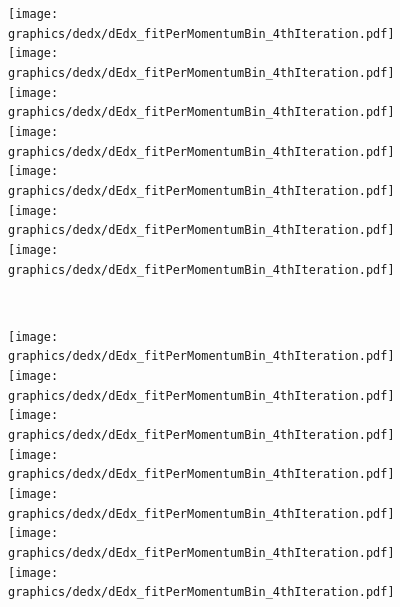 \begin{figure}[t!]%
\ContinuedFloat%
\centering%
\parbox{0.495\textwidth}{
  \centering
  \texttt{[image: graphics/dedx/dEdx\_fitPerMomentumBin\_4thIteration.pdf]}\\[3pt]
  \texttt{[image: graphics/dedx/dEdx\_fitPerMomentumBin\_4thIteration.pdf]}\\[3pt]
  \texttt{[image: graphics/dedx/dEdx\_fitPerMomentumBin\_4thIteration.pdf]}\\[3pt]
  \texttt{[image: graphics/dedx/dEdx\_fitPerMomentumBin\_4thIteration.pdf]}\\[3pt]
  \texttt{[image: graphics/dedx/dEdx\_fitPerMomentumBin\_4thIteration.pdf]}\\[3pt]
  \texttt{[image: graphics/dedx/dEdx\_fitPerMomentumBin\_4thIteration.pdf]}\\[3pt]
  \texttt{[image: graphics/dedx/dEdx\_fitPerMomentumBin\_4thIteration.pdf]}
}~
\parbox{0.495\textwidth}{
  \centering
  \texttt{[image: graphics/dedx/dEdx\_fitPerMomentumBin\_4thIteration.pdf]}\\[3pt]
  \texttt{[image: graphics/dedx/dEdx\_fitPerMomentumBin\_4thIteration.pdf]}\\[3pt]
  \texttt{[image: graphics/dedx/dEdx\_fitPerMomentumBin\_4thIteration.pdf]}\\[3pt]
  \texttt{[image: graphics/dedx/dEdx\_fitPerMomentumBin\_4thIteration.pdf]}\\[3pt]
  \texttt{[image: graphics/dedx/dEdx\_fitPerMomentumBin\_4thIteration.pdf]}\\[3pt]
  \texttt{[image: graphics/dedx/dEdx\_fitPerMomentumBin\_4thIteration.pdf]}\\[3pt]
  \texttt{[image: graphics/dedx/dEdx\_fitPerMomentumBin\_4thIteration.pdf]}
}%
\end{figure}
% 
% 
% 
% 
% 
% 
% 
% 
% 
% 
% 
% 
% 
% 

